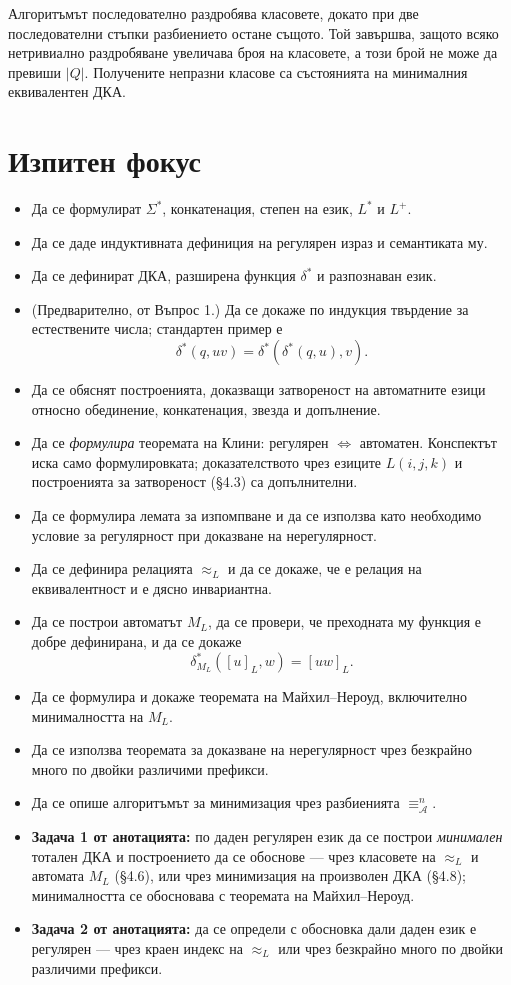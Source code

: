 Алгоритъмът последователно раздробява класовете, докато при две последователни стъпки разбиението остане същото. Той завършва, защото всяко нетривиално раздробяване увеличава броя на класовете, а този брой не може да превиши $|Q|$. Получените непразни класове са състоянията на минималния еквивалентен ДКА.

\section{Изпитен фокус}\label{s:4.9}

\begin{itemize}
\item Да се формулират $\Sigma^*$, конкатенация, степен на език, $L^*$ и $L^+$.
\item Да се даде индуктивната дефиниция на регулярен израз и семантиката му.
\item Да се дефинират ДКА, разширена функция $\delta^*$ и разпознаван език.
\item (Предварително, от Въпрос 1.) Да се докаже по индукция твърдение за естествените числа; стандартен пример е
\[
\delta^*(q,uv)=\delta^*(\delta^*(q,u),v).
\]
\item Да се обяснят построенията, доказващи затвореност на автоматните езици относно обединение, конкатенация, звезда и допълнение.
\item Да се \emph{формулира} теоремата на Клини: регулярен $\Leftrightarrow$ автоматен. Конспектът иска само формулировката; доказателството чрез езиците $L(i,j,k)$ и построенията за затвореност (\S4.3) са допълнителни.
\item Да се формулира лемата за изпомпване и да се използва като необходимо условие за регулярност при доказване на нерегулярност.
\item Да се дефинира релацията $\approx_L$ и да се докаже, че е релация на еквивалентност и е дясно инвариантна.
\item Да се построи автоматът $M_L$, да се провери, че преходната му функция е добре дефинирана, и да се докаже
\[
\delta_{M_L}^*([u]_L,w)=[uw]_L.
\]
\item Да се формулира и докаже теоремата на Майхил--Нероуд, включително минималността на $M_L$.
\item Да се използва теоремата за доказване на нерегулярност чрез безкрайно много по двойки различими префикси.
\item Да се опише алгоритъмът за минимизация чрез разбиенията $\equiv_{\mathcal A}^n$.
\item \textbf{Задача 1 от анотацията:} по даден регулярен език да се построи \emph{минимален} тотален ДКА и построението да се обоснове --- чрез класовете на $\approx_L$ и автомата $M_L$ (\S4.6), или чрез минимизация на произволен ДКА (\S4.8); минималността се обосновава с теоремата на Майхил--Нероуд.
\item \textbf{Задача 2 от анотацията:} да се определи с обосновка дали даден език е регулярен --- чрез краен индекс на $\approx_L$ или чрез безкрайно много по двойки различими префикси.
\end{itemize}
